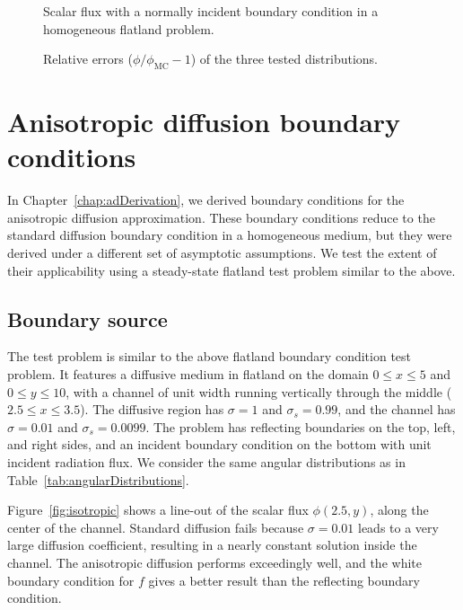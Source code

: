 \begin{figure}[tb]
  \centering\small
  \hspace{-.25in}%
  
  \caption{Scalar flux with a normally incident boundary condition in a
  homogeneous flatland problem.}
  \label{fig:flatlandBcDelta}
\end{figure}
 
\begin{figure}[tb]
  \centering\small
  \hspace{-.25in}%
  
  \caption{Relative errors ($\phi/\phi_\text{MC} - 1$) of the three tested
  distributions.}
  \label{fig:flatlandBcRelative}
\end{figure}

\section{Anisotropic diffusion boundary conditions}

In Chapter~\ref{chap:adDerivation}, we derived boundary conditions for the
anisotropic diffusion approximation. These boundary conditions reduce to the
standard diffusion boundary condition in a homogeneous medium, but they were
derived under a different set of asymptotic assumptions. We test the extent of
their applicability using a steady-state flatland test problem similar to the
above.

\subsection{Boundary source}
The test problem is similar to the above flatland boundary condition test
problem. It features a diffusive medium in flatland on the domain $0
\le x \le 5$ and $0 \le y \le 10$, with a channel of unit width running
vertically through the middle ($2.5 \le x \le 3.5$). The diffusive region has
$\sigma=1$ and $\sigma_s=0.99$, and the channel has $\sigma=0.01$ and
$\sigma_s=0.0099$. The problem has reflecting boundaries on the top, left, and
right sides, and an incident boundary condition on the bottom with unit
incident radiation flux. We consider the same angular distributions as in
Table~\ref{tab:angularDistributions}.

Figure~\ref{fig:isotropic} shows a line-out of the scalar flux $\phi(2.5,y)$,
along the center
of the channel. Standard diffusion fails because $\sigma=0.01$ leads to a very
large diffusion coefficient, resulting in a nearly constant solution inside the
channel. The anisotropic diffusion performs exceedingly well, and the
white boundary condition for $f$ gives a better result than the reflecting
boundary condition.


